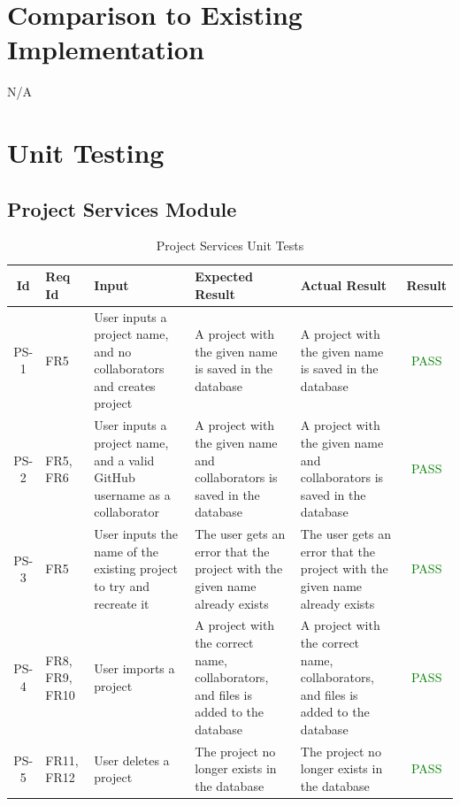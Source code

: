 \documentclass[12pt, titlepage]{article}
\begin{document}
	\section{Comparison to Existing Implementation}	
	
	N/A
	
	\section{Unit Testing}
	
	\subsection{Project Services Module}
	
	\begin{center}
		\begin{longtable}{|c|p{1cm}|p{2.7cm}|p{3cm}|p{3cm}|c|}
			\caption{Project Services Unit Tests \label{long}}\\
			\hline
			\textbf{Id} & \textbf{Req Id} & \textbf{Input} & \textbf{Expected Result} & \textbf{Actual Result} & \textbf{Result}   \\
			\hline
			PS-1 & FR5  & User inputs a project name, and no collaborators and creates project & A project with the given name is saved in the database  &  A project with the given name is saved in the database &  \textcolor{green}{PASS} \\
			\hline
			PS-2 & FR5, FR6  & User inputs a project name, and a valid GitHub username as a collaborator & A project with the given name and collaborators is saved in the database & A project with the given name and collaborators is saved in the database &  \textcolor{green}{PASS} \\
			\hline
			PS-3 & FR5 & User inputs the name of the existing project to try and recreate it & The user gets an error that the project with the given name already exists & The user gets an error that the project with the given name already exists &  \textcolor{green}{PASS} \\
			\hline
			PS-4 & FR8, FR9, FR10  & User imports a project & A project with the correct name, collaborators, and files is added to the database & A project with the correct name, collaborators, and files is added to the database &  \textcolor{green}{PASS} \\
			\hline
			PS-5 & FR11, FR12  & User deletes a project & The project no longer exists in the database & The project no longer exists in the database &  \textcolor{green}{PASS} \\

\end{longtable}
\end{center}
\end{document}
